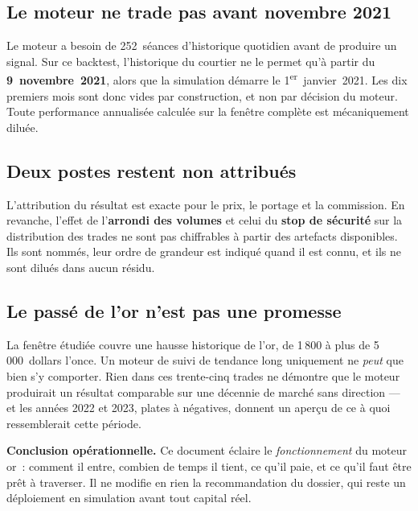 \subsection*{Le moteur ne trade pas avant novembre 2021}

Le moteur a besoin de 252~séances d'historique quotidien avant de produire un
signal. Sur ce backtest, l'historique du courtier ne le permet qu'à partir du
\textbf{9~novembre~2021}, alors que la simulation démarre le
1\textsuperscript{er}~janvier~2021. Les dix premiers mois sont donc vides par
construction, et non par décision du moteur. Toute performance annualisée
calculée sur la fenêtre complète est mécaniquement diluée.

\subsection*{Deux postes restent non attribués}

L'attribution du résultat est exacte pour le prix, le portage et la commission.
En revanche, l'effet de l'\textbf{arrondi des volumes} et celui du
\textbf{stop de sécurité} sur la distribution des trades ne sont pas
chiffrables à partir des artefacts disponibles. Ils sont nommés, leur ordre de
grandeur est indiqué quand il est connu, et ils ne sont dilués dans aucun
résidu.

\subsection*{Le passé de l'or n'est pas une promesse}

La fenêtre étudiée couvre une hausse historique de l'or, de 1\,800 à plus de
5\,000~dollars l'once. Un moteur de suivi de tendance long uniquement ne
\emph{peut} que bien s'y comporter. Rien dans ces trente-cinq trades ne
démontre que le moteur produirait un résultat comparable sur une décennie de
marché sans direction --- et les années 2022 et 2023, plates à négatives,
donnent un aperçu de ce à quoi ressemblerait cette période.

\begin{warningbox}
\textbf{Conclusion opérationnelle.} Ce document éclaire le \emph{fonctionnement}
du moteur or~: comment il entre, combien de temps il tient, ce qu'il paie, et ce
qu'il faut être prêt à traverser. Il ne modifie en rien la recommandation du
dossier, qui reste un déploiement en simulation avant tout capital réel.
\end{warningbox}
